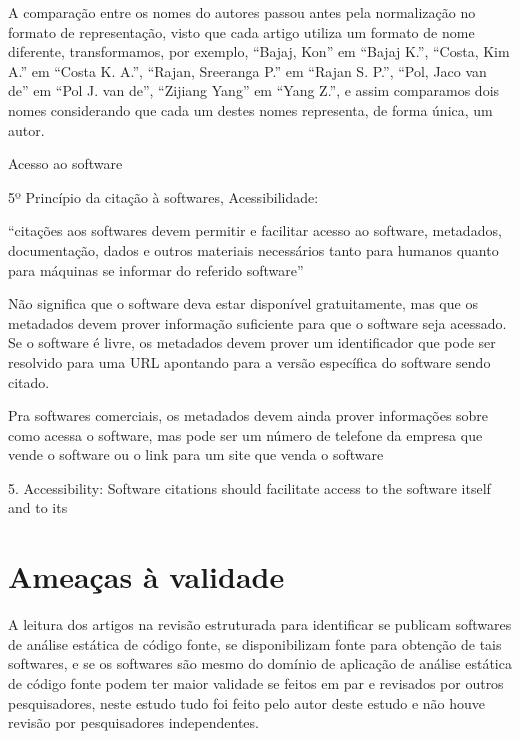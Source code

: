 A comparação entre os nomes do autores passou antes pela normalização
no formato de representação, visto que cada artigo utiliza um formato
de nome diferente, transformamos, por exemplo, ``Bajaj, Kon'' em ``Bajaj K.'',
``Costa, Kim A.'' em ``Costa K. A.'', ``Rajan, Sreeranga P.'' em ``Rajan S. P.'',
``Pol, Jaco van de'' em ``Pol J. van de'', ``Zijiang Yang'' em ``Yang Z.'',
e assim comparamos dois nomes considerando que cada um destes nomes representa,
de forma única, um autor.

Acesso ao software

5º Princípio da citação à softwares, Acessibilidade:

``citações aos softwares devem permitir e facilitar acesso ao software,
metadados, documentação, dados e outros materiais necessários tanto
para humanos quanto para máquinas se informar do referido software''

Não significa que o software deva estar disponível gratuitamente, mas que
os metadados devem prover informação suficiente para que o software seja
acessado. Se o software é livre, os metadados devem prover um identificador
que pode ser resolvido para uma URL apontando para a versão específica
do software sendo citado.

Pra softwares comerciais, os metadados devem ainda prover informações sobre
como acessa o software, mas pode ser um número de telefone da empresa que
vende o software ou o link para um site que venda o software

\cite{smith2016software}

5. Accessibility: Software citations should facilitate access to the software itself and to its


\section{Ameaças à validade}

A leitura dos artigos na revisão estruturada para identificar se publicam
softwares de análise estática de código fonte, se disponibilizam fonte para
obtenção de tais softwares, e se os softwares são mesmo do domínio de aplicação
de análise estática de código fonte podem ter maior validade se feitos em
par e revisados por outros pesquisadores, neste estudo tudo foi feito pelo
autor deste estudo e não houve revisão por pesquisadores independentes.

